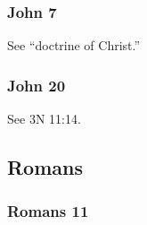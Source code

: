 	\subsubsection{John 7} %
	
		\begin{compactdesc}
		
		\item[16$\vert$]
		\begin{compactdesc}
		\item[my doctrine is not mine] See ``doctrine of Christ.''
		\end{compactdesc}
		
		\end{compactdesc}
		
	\subsubsection{John 20} %
	
		\begin{compactdesc}
		
		\item[25$\vert$]
		\begin{compactdesc}
		\item[put my finger/thrust] See 3N 11:14.
		\end{compactdesc}
		
		\end{compactdesc}

\subsection{Romans} %

	\subsubsection{Romans 11} %

